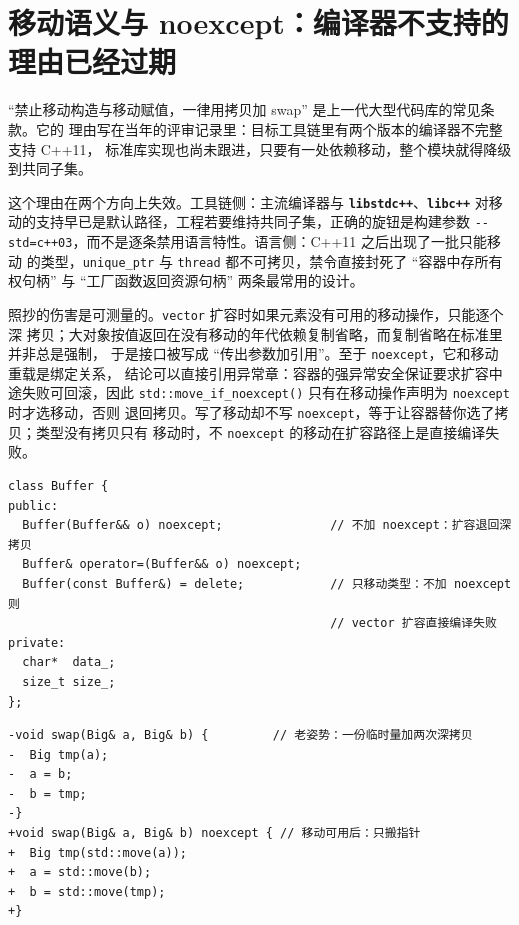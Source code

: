\documentclass[12pt,a4paper,fontset=fandol]{ctexbook}
\newcommand{\cpp}[1]{C++#1}
\newcommand{\Fn}[1]{\texttt{#1()}}
\newcommand{\Tp}[1]{\texttt{#1}}
\newcommand{\Opt}[1]{\texttt{-\/-#1}}
\newcommand{\Bk}{\discretionary{}{}{}}
\newcommand{\Lib}[1]{\textbf{\texttt{#1}}}
\begin{document}
\section{移动语义与 noexcept：编译器不支持的理由已经过期}
\label{sec:ch12-move}

``禁止移动构造与移动赋值，一律用拷贝加 swap'' 是上一代大型代码库的常见条款。它的
理由写在当年的评审记录里：目标工具链里有两个版本的编译器不完整支持 \cpp{11}，
标准库实现也尚未跟进，只要有一处依赖移动，整个模块就得降级到共同子集。

这个理由在两个方向上失效。工具链侧：主流编译器与 \Lib{libstdc++}、\Lib{libc++}
对移动的支持早已是默认路径，工程若要维持共同子集，正确的旋钮是构建参数
\Opt{std=c++03}，而不是逐条禁用语言特性。语言侧：\cpp{11} 之后出现了一批只能移动
的类型，\Tp{unique\_ptr} 与 \Tp{thread} 都不可拷贝，禁令直接封死了
``容器中存所有权句柄'' 与 ``工厂函数返回资源句柄'' 两条最常用的设计。

照抄的伤害是可测量的。\Tp{vector} 扩容时如果元素没有可用的移动操作，只能逐个深
拷贝；大对象按值返回在没有移动的年代依赖复制省略，而复制省略在标准里并非总是强制，
于是接口被写成 ``传出参数加引用''。至于 \Tp{noexcept}，它和移动重载是绑定关系，
结论可以直接引用异常章：容器的强异常安全保证要求扩容中途失败可回滚，因此
\Fn{std::{\Bk}move\_if{\Bk}\_noexcept} 只有在移动操作声明为 \Tp{noexcept} 时才选移动，否则
退回拷贝。写了移动却不写 \Tp{noexcept}，等于让容器替你选了拷贝；类型没有拷贝只有
移动时，不 \Tp{noexcept} 的移动在扩容路径上是直接编译失败。

\begin{lstlisting}[style=cppstyle,caption={移动重载与 \Tp{noexcept} 必须成对出现},label={lst:ch12-move}]
class Buffer {
public:
  Buffer(Buffer&& o) noexcept;               // 不加 noexcept：扩容退回深拷贝
  Buffer& operator=(Buffer&& o) noexcept;
  Buffer(const Buffer&) = delete;            // 只移动类型：不加 noexcept 则
                                             // vector 扩容直接编译失败
private:
  char*  data_;
  size_t size_;
};
\end{lstlisting}

\begin{lstlisting}[style=diffstyle,caption={禁令解除后的典型改写：手写深交换换成移动},label={lst:ch12-swap}]
-void swap(Big& a, Big& b) {         // 老姿势：一份临时量加两次深拷贝
-  Big tmp(a);
-  a = b;
-  b = tmp;
-}
+void swap(Big& a, Big& b) noexcept { // 移动可用后：只搬指针
+  Big tmp(std::move(a));
+  a = std::move(b);
+  b = std::move(tmp);
+}
\end{lstlisting}
\end{document}
